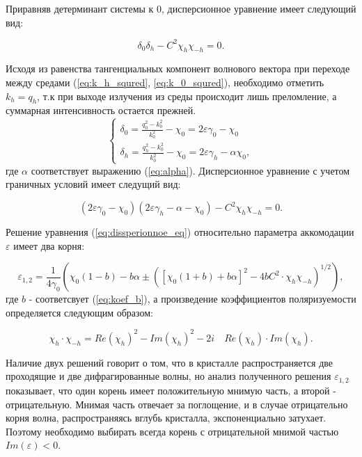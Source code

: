 Приравняв детерминант системы к 0, дисперсионное уравнение имеет следующий вид:

\begin{equation}
   \delta_0 \delta_h -C^2 \chi_h \chi_{-h} = 0.
\end{equation}

Исходя из равенства тангенциальных компонент волнового вектора при переходе
 между средами (\ref{eq:k_h_squred}, \ref{eq:k_0_squred}),
необходимо отметить $k_h = q_h$, т.к при выходе излучения из среды происходит
лишь преломление, а суммарная интенсивность остается прежней.
\begin{equation}
 \begin{cases}
   \delta_0 = \frac{q_0^2 - k_0^2}{k_0^2} - \chi_0 = 2\varepsilon\gamma_0 - \chi_0
   \\
   \delta_h = \frac{q_h^2 - k_0^2}{k_0^2} - \chi_0 = 2\varepsilon\gamma_h - \alpha \chi_0,
 \end{cases}
\end{equation}
\noindent
где $\alpha$ соответствует выражению (\ref{eq:alpha}). Дисперсионное уравнение
с учетом граничных условий имеет следущий вид:

\begin{equation}
   (2\varepsilon \gamma_0 - \chi_0)(2\varepsilon \gamma_h - \alpha - \chi_0) - C^2 \chi_h\chi_{-h} = 0.
   \label{eq:dissperionnoe_eq}
\end{equation}

Решение уравнения (\ref{eq:dissperionnoe_eq}) относительно параметра аккомодации $\varepsilon$ имеет два корня:

\begin{equation}
   \varepsilon_{1,2} = \frac{1}{4\gamma_0} \left( \chi_0 (1-b) - b\alpha \pm \left( [\chi_0(1+b)+b\alpha]^2 - 4bC^2 \cdot \chi_{h}\chi_{-h} \right)^{1/2} \right),
\end{equation}
\noindent
где $b$ - соответсвует (\ref{eq:koef_b}),  а произведение коэффициентов
 поляризуемости определяется следующим образом:

 $$\chi_{h} \cdot \chi_{-h} = Re(\chi_{h})^2-Im(\chi_{h})^2 - 2i \quad Re(\chi_{h}) \cdot Im(\chi_{h}).$$

Наличие двух решений говорит о том, что в кристалле распространяется две проходящие и две дифрагированные волны, но
анализ полученного решения $ \varepsilon_{1,2}$ показывает, что один корень имеет положительную мнимую часть, а второй -
отрицательную. Мнимая часть отвечает за поглощение, и в случае отрицательно корня волна, распространяясь
вглубь кристалла, экспоненциально затухает. Поэтому необходимо выбирать всегда корень с отрицательной мнимой частью
$Im(\varepsilon)<0$.

